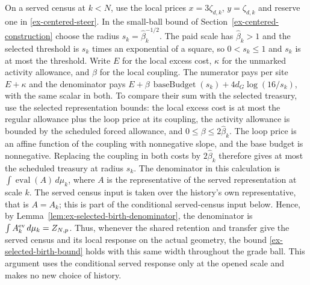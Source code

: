 On a served census at $k<N$, use the local prices
$x=3\zeta_{d,k}$, $y=\zeta_{d,k}$ and reserve one in
\eqref{ex-centered-steer}. In the small-ball bound of
Section~\ref{ex-centered-construction} choose the radius
$s_k=\widehat\beta_k^{-1/2}$. The paid scale has
$\widehat\beta_k>1$ and the selected threshold is $s_k$ times an
exponential of a square, so $0<s_k\le1$ and $s_k$ is at most the
threshold. Write $E$ for the local excess cost, $\kappa$ for the
unmarked activity allowance, and $\beta$ for the local coupling.
The numerator pays per site $E+\kappa$ and the denominator pays
$E+\beta\,\operatorname{baseBudget}(s_k)+4d_G\log(16/s_k)$,
with the same scalar in both. To compare their sum with the selected
treasury, use the selected representation bounds: the local excess
cost is at most the regular allowance plus the loop price at its
coupling, the activity allowance is bounded by the scheduled forced
allowance, and $0\le\beta\le2\widehat\beta_k$. The loop price is an
affine function of the coupling with nonnegative slope, and the
base budget is nonnegative. Replacing the coupling in both costs
by $2\widehat\beta_k$ therefore gives at most the scheduled treasury
at radius $s_k$. The denominator in this calculation is
$\int\operatorname{eval}(A)\,d\mu_k$, where $A$ is the representative of
the served representation at scale $k$. The served census input is
taken over the history's own representative, that is $A=A_k$; this is
part of the conditional served-census input below. Hence, by
Lemma~\ref{lem:ex-selected-birth-denominator}, the denominator is
$\int A_k^{\rm ev}\,d\mu_k=Z_{N,p}$.
Thus, whenever the shared retention and transfer give the served
census and its local response on the actual geometry, the bound
\eqref{ex-selected-birth-bound} holds with this same width throughout
the grade ball. This argument uses the conditional served response
only at the opened scale and makes no new choice of history.
